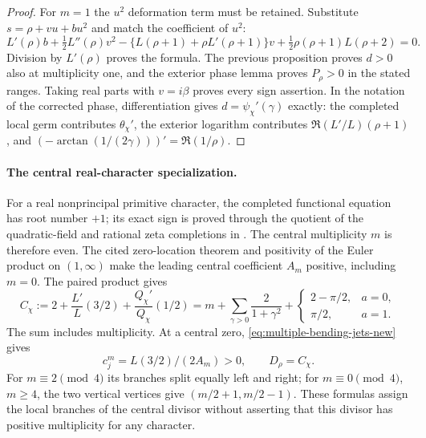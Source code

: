 \begin{proof}
For $m=1$ the $u^2$ deformation term must be retained.
Substitute $s=\rho+vu+bu^2$ and match the coefficient of
$u^2$:
\[
 L'(\rho)b+\tfrac12L''(\rho)v^2
 -\{L(\rho+1)+\rho L'(\rho+1)\}v
 +\tfrac12\rho(\rho+1)L(\rho+2)=0.
\]
Division by $L'(\rho)$ proves the formula. The previous
proposition proves $d>0$ also at multiplicity one, and the
exterior phase lemma proves $P_\rho>0$ in the stated ranges.
Taking real parts with $v=i\beta$ proves every sign assertion.
In the notation of the corrected phase, differentiation gives
$d=\psi_\chi'(\gamma)$ exactly: the completed local germ
contributes $\theta_\chi'$, the exterior logarithm contributes
$\Re(L'/L)(\rho+1)$, and
$(-\arctan(1/(2\gamma)))'=\Re(1/\rho)$.
\end{proof}

\paragraph{The central real-character specialization.}
For a real nonprincipal primitive character, the completed
functional equation has root number $+1$; its exact sign is
proved through the quotient of the quadratic-field and rational
zeta completions in \cite[Section~1, equations (1.3)--(1.6)]{gross-signs}.
The central multiplicity $m$ is therefore even. The cited
zero-location theorem and positivity of the Euler product on
$(1,\infty)$ make the leading central coefficient $A_m$
positive, including $m=0$. The paired product gives
\[
 C_\chi:=2+\frac{L'}L(3/2)+\frac{Q_\chi'}{Q_\chi}(1/2)
 =m+\sum_{\gamma>0}\frac2{1+\gamma^2}
 +\begin{cases}2-\pi/2,&a=0,\\ \pi/2,&a=1.\end{cases}
\]
The sum includes multiplicity. At a central zero,
\eqref{eq:multiple-bending-jets-new} gives
\[ c_j^m=L(3/2)/(2A_m)>0,\qquad D_\rho=C_\chi. \]
For $m\equiv2\pmod4$ its branches split equally left and
right; for $m\equiv0\pmod4$, $m\ge4$, the two vertical
vertices give $(m/2+1,m/2-1)$. These formulas assign the
local branches of the central divisor without asserting that
this divisor has positive multiplicity for any character.

